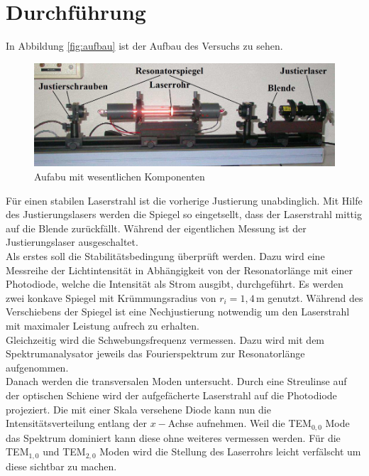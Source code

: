\section{Durchführung}
\label{sec:Durchführung}

In Abbildung \ref{fig:aufbau} ist der Aufbau des Versuchs zu sehen.

\begin{figure}
    \centering
    \includegraphics[width=\textwidth]{data/aufbau.png}
    \caption{Aufabu mit wesentlichen Komponenten}
\end{figure}

Für einen stabilen Laserstrahl ist die vorherige Justierung unabdinglich.
Mit Hilfe des Justierungslasers werden die Spiegel so eingetsellt, dass der Laserstrahl mittig auf die Blende zurückfällt.
Während der eigentlichen Messung ist der Justierungslaser ausgeschaltet.\\
Als erstes soll die Stabilitätsbedingung überprüft werden. 
Dazu wird eine Messreihe der Lichtintensität in Abhängigkeit von der Resonatorlänge mit einer Photodiode, welche die Intensität als Strom ausgibt, durchgeführt.
Es werden zwei konkave Spiegel mit Krümmungsradius von $r_i=1,4\,$m genutzt.
Während des Verschiebens der Spiegel ist eine Nechjustierung notwendig um den Laserstrahl mit maximaler Leistung aufrech zu erhalten.\\
Gleichzeitig wird die Schwebungsfrequenz vermessen.
Dazu wird mit dem Spektrumanalysator jeweils das Fourierspektrum zur Resonatorlänge aufgenommen.\\

Danach werden die transversalen Moden untersucht.
Durch eine Streulinse auf der optischen Schiene wird der aufgefächerte Laserstrahl auf die Photodiode projeziert.
Die mit einer Skala versehene Diode kann nun die Intensitätsverteilung entlang der $x-$Achse aufnehmen.
Weil die TEM$_{0,0}$ Mode das Spektrum dominiert kann diese ohne weiteres vermessen werden.
Für die TEM$_{1,0}$ und TEM$_{2,0}$ Moden wird die Stellung des Laserrohrs leicht verfälscht um diese sichtbar zu machen.\\

